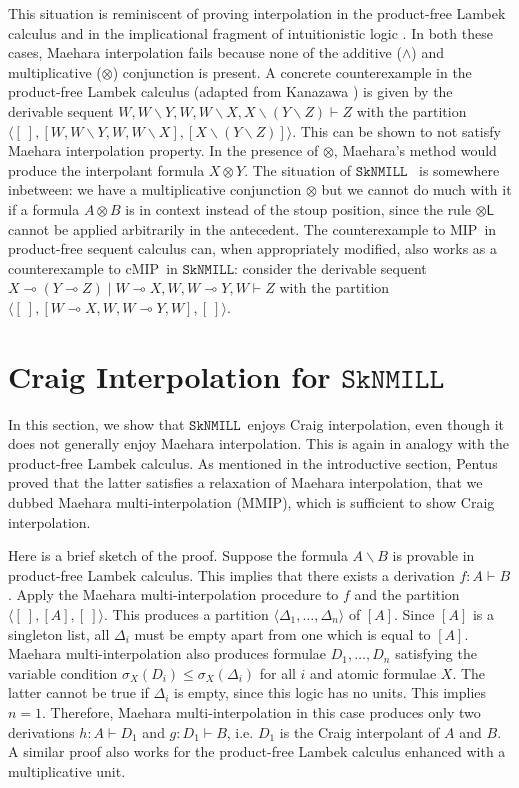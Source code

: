 \documentclass[sn-mathphys-num]{sn-jnl}%
\newcommand{\GD}{\Delta}
\newcommand{\vd}{\vdash}
\newcommand{\tl}{\otimes \mathsf{L}}
\newcommand{\ot}{\otimes}
\newcommand{\lolli}{\multimap}
\newcommand{\bsls}{\backslash}
\newcommand{\SkNMILL}{$\mathtt{SkNMILL}$}
\newcommand{\MIP}{\textsf{MIP}}
\newcommand{\MMIP}{\textsf{MMIP}}
\newcommand{\cMIP}{\textsf{cMIP}}
\theoremstyle{thmstyleone}%
\theoremstyle{thmstyletwo}%
\theoremstyle{thmstylethree}%
\begin{document}
This situation is reminiscent of proving interpolation in the product-free Lambek calculus \cite{Pentus1997} and in the implicational fragment of intuitionistic logic \cite{Kanazawa2006}.
In both these cases, Maehara interpolation fails because none of the additive ($\land$) and multiplicative ($\ot$) conjunction is present.
A concrete counterexample in the product-free Lambek calculus (adapted from Kanazawa \cite{Kanazawa2006}) is given by the derivable sequent $W, W\bsls Y, W , W \bsls X , X \bsls (Y \bsls Z) \vd Z$ with the partition $\langle [\ ] , [W, W\bsls Y, W , W \bsls X], [X \bsls (Y \bsls Z)] \rangle$. This can be shown to not satisfy Maehara interpolation property. In the presence of $\ot$,  Maehara's method would produce the interpolant formula $X \ot Y$. The situation of \SkNMILL~ is somewhere inbetween: we have a multiplicative conjunction $\ot$ but we cannot do much with it if a formula $A \ot B$ is in context instead of the stoup position, since the rule $\tl$ cannot be applied arbitrarily in the antecedent.
The counterexample to \MIP~in product-free sequent calculus can, when appropriately modified, also works as a counterexample to \cMIP~in \SkNMILL: consider the derivable sequent  $X \lolli (Y \lolli Z) \mid W \lolli X, W , W \lolli Y, W \vd Z$ with the partition $\langle [\ ] , [W \lolli X, W , W \lolli Y, W], [\ ] \rangle$.

\section{Craig Interpolation for \SkNMILL}\label{sec:interpolation}

In this section, we show that \SkNMILL~enjoys Craig interpolation, even though it does not generally enjoy Maehara interpolation.
This is again in analogy with the product-free Lambek calculus. 
As mentioned in the introductive section, Pentus \cite{Pentus1997} proved that the latter satisfies a relaxation of Maehara interpolation, that we dubbed Maehara multi-interpolation (\MMIP), which is sufficient to show Craig interpolation. 

Here is a brief sketch of the proof. 
Suppose the formula $A \bsls B$ is provable in product-free Lambek calculus.
This implies that there exists a derivation $f : A \vd B$.
Apply the Maehara multi-interpolation procedure to $f$ and the partition $\langle [\ ],[A],[\ ]\rangle$.
This produces a partition $\langle \GD_1,\dots,\GD_n \rangle$ of $[A]$.
Since $[A]$ is a singleton list, all $\GD_i$ must be empty apart from one which is equal to $[A]$.
Maehara multi-interpolation also produces formulae $D_1,\dots,D_n$ satisfying the variable condition $\sigma_X(D_i) \leq \sigma_X(\GD_i)$ for all $i$ and atomic formulae $X$. 
The latter cannot be true if $\GD_i$ is empty, since this logic has no units.
This implies $n = 1$.
Therefore, Maehara multi-interpolation in this case produces only two derivations $h : A \vd D_1$ and $g : D_1 \vd B$, i.e. $D_1$ is the Craig interpolant of $A$ and $B$.
A similar proof also works for the product-free Lambek calculus enhanced with a multiplicative unit.
\end{document}

